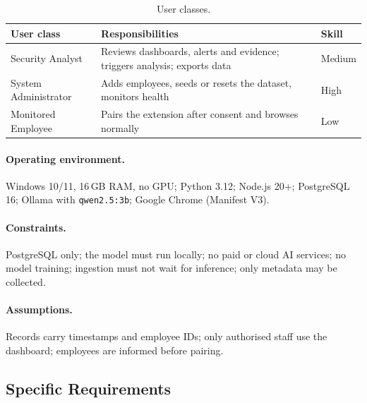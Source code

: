 \documentclass[openany]{tietreport}
\begin{document}
\begin{table}[H]
\centering
\small
\caption{User classes.}
\label{tab:users}
\begin{tabularx}{\linewidth}{@{}lYl@{}}
\toprule
\textbf{User class} & \textbf{Responsibilities} & \textbf{Skill} \\
\midrule
Security Analyst & Reviews dashboards, alerts and evidence; triggers analysis; exports data & Medium \\
System Administrator & Adds employees, seeds or resets the dataset, monitors health & High \\
Monitored Employee & Pairs the extension after consent and browses normally & Low \\
\bottomrule
\end{tabularx}
\end{table}

\paragraph{Operating environment.} Windows 10/11, 16\,GB RAM, no GPU; Python 3.12; Node.js 20+;
PostgreSQL 16; Ollama with \texttt{qwen2.5:3b}; Google Chrome (Manifest V3).

\paragraph{Constraints.} PostgreSQL only; the model must run locally; no paid or cloud AI services; no
model training; ingestion must not wait for inference; only metadata may be collected.

\paragraph{Assumptions.} Records carry timestamps and employee IDs; only authorised staff use the
dashboard; employees are informed before pairing.

\subsection{Specific Requirements}
\end{document}
